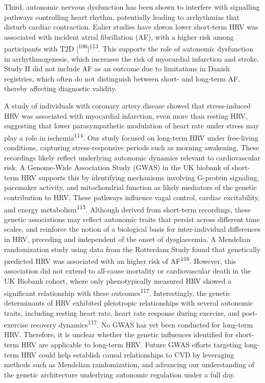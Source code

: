 \documentclass[
  letterpaper,
  headsepline=true,
  open=any]{scrbook}
\begin{document}
Third, autonomic nervous dysfunction has been shown to interfere with
signalling pathways controlling heart rhythm, potentially leading to
arrhythmias that disturb cardiac contraction. Ealier studies have shwon
lower short-term HRV was associated with incident atrial fibrillation
(AF), with a higher risk among participants with T2D
{[}\textsuperscript{106}{]}\textsuperscript{113}. This supports the role
of autonomic dysfunction in arrhythmogenesis, which increases the risk
of myocardial infarction and stroke. Study II did not include AF as an
outcome due to limitations in Danish registries, which often do not
distinguish between short- and long-term AF, thereby affecting
diagnostic validity.

A study of individuals with coronary artery disease showed that
stress-induced HRV was associated with myocardial infarction, even more
than resting HRV, suggesting that lower parasympathetic modulation of
heart rate under stress may play a role in
ischemia\textsuperscript{114}. Our study focused on long-term HRV under
free-living conditions, capturing stress-responsive periods such as
morning awakening. These recordings likely reflect underlying autonomic
dynamics relevant to cardiovascular risk. A Genome-Wide Association
Study (GWAS) in the UK biobank of short-term HRV supports this by
identifying mechanisms involving G-protein signaling, pacemaker
activity, and mitochondrial function as likely mediators of the genetic
contribution to HRV. These pathways influence vagal control, cardiac
excitability, and energy metabolism\textsuperscript{115}. Although
derived from short-term recordings, these genetic associations may
reflect autonomic traits that persist across different time scales, and
reinforce the notion of a biological basis for inter-individual
differences in HRV, preceding and independent of the onset of
dysglaecemia. A Mendelian randomization study using data from the
Rotterdam Study found that genetically predicted HRV was associated with
an higher risk of AF\textsuperscript{116}. However, this association did
not extend to all-cause mortality or cardiovascular death in the UK
Biobank cohort, where only phenotypically measured HRV showed a
significant relationship with these outcomes\textsuperscript{117}.
Interestingly, the genetic determinants of HRV exhibited pleiotropic
relationships with several autonomic traits, including resting heart
rate, heart rate response during exercise, and post-exercise recovery
dynamics\textsuperscript{117}. No GWAS has yet been conducted for
long-term HRV. Therefore, it is unclear whether the genetic influences
identified for short-term HRV are applicable to long-term HRV. Future
GWAS efforts targeting long-term HRV could help establish causal
relationships to CVD by leveraging methods such as Mendelian
randomization, and advancing our understanding of the genetic
architecture underlying autonomic regulation under a full day.
\end{document}

